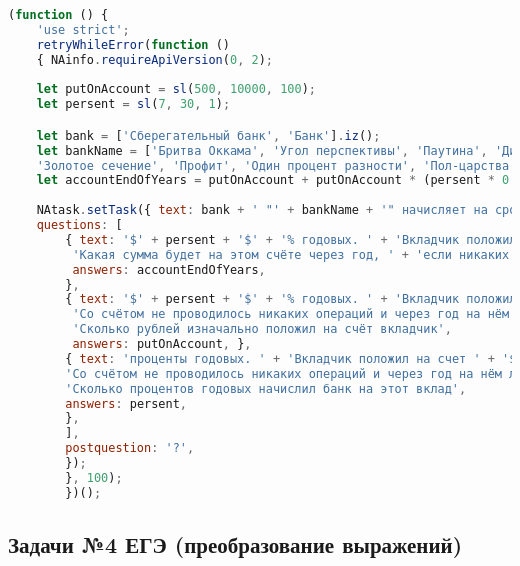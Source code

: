\begin{lstlisting}[language=JavaScript]
(function () { 
    'use strict'; 
    retryWhileError(function () 
    { NAinfo.requireApiVersion(0, 2); 
    
    let putOnAccount = sl(500, 10000, 100); 
    let persent = sl(7, 30, 1); 

    let bank = ['Сберегательный банк', 'Банк'].iz(); 
    let bankName = ['Бритва Оккама', 'Угол перспективы', 'Паутина', 'Динамика роста', 'Вожжи коммерции', ' Сыграй в ящик', 'Копилка', 
    'Золотое сечение', 'Профит', 'Один процент разности', 'Пол-царства', 'Падает вверх', 'Из грязи В князи'].iz(); 
    let accountEndOfYears = putOnAccount + putOnAccount * (persent * 0.01); 
    
    NAtask.setTask({ text: bank + ' "' + bankName + '" начисляет на срочный вклад ', 
    questions: [ 
        { text: '$' + persent + '$' + '% годовых. ' + 'Вкладчик положил на счет ' + '$' + putOnAccount + '$' + ' р. ' +
         'Какая сумма будет на этом счёте через год, ' + 'если никаких операций со счётом проводиться не будет', 
         answers: accountEndOfYears, 
        }, 
        { text: '$' + persent + '$' + '% годовых. ' + 'Вкладчик положил на счёт некоторую сумму. ' +
         'Со счётом не проводилось никаких операций и через год на нём лежала сумма равная ' + '$' + accountEndOfYears + '$' + ' р. ' + 
         'Сколько рублей изначально положил на счёт вкладчик', 
         answers: putOnAccount, }, 
        { text: 'проценты годовых. ' + 'Вкладчик положил на счет ' + '$' + putOnAccount + '$' + ' р. ' + 
        'Со счётом не проводилось никаких операций и через год на нём лежала сумма равная ' + '$' + accountEndOfYears + '$' + ' р. ' + 
        'Сколько процентов годовых начислил банк на этот вклад', 
        answers: persent, 
        }, 
        ], 
        postquestion: '?', 
        }); 
        }, 100); 
        })();
\end{lstlisting}

\subsection{Задачи №4 ЕГЭ (преобразование выражений)}

